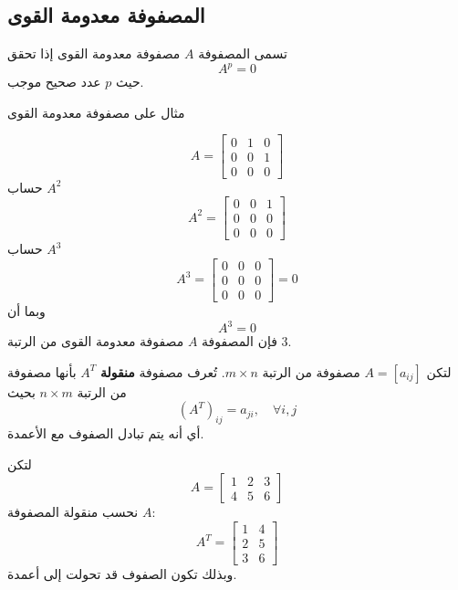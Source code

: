 	\subsection{المصفوفة معدومة القوى}
	تسمى المصفوفة $A$ مصفوفة معدومة القوى إذا تحقق
	\[
	A^p = 0
	\]
	حيث $p$ عدد صحيح موجب.\\
	\begin{example}
		مثال على مصفوفة معدومة القوى
		
		\[
		A=
		\begin{bmatrix}
			0 & 1 & 0\\
			0 & 0 & 1\\
			0 & 0 & 0
		\end{bmatrix}
		\]
		حساب \(A^2\)
		\[
		A^2 =
		\begin{bmatrix}
			0 & 0 & 1\\
			0 & 0 & 0\\
			0 & 0 & 0
		\end{bmatrix}
		\]
		حساب \(A^3\)
		\[
		A^3 =
		\begin{bmatrix}
			0 & 0 & 0\\
			0 & 0 & 0\\
			0 & 0 & 0
		\end{bmatrix}
		= 0
		\]
		وبما أن
		\[
		A^3 = 0
		\]
		فإن المصفوفة \(A\) مصفوفة معدومة القوى من الرتبة \(3\).
	\end{example}
	
	\begin{definition}
		لتكن $A = [a_{ij}]$ مصفوفة من الرتبة $m \times n$.  
		تُعرف مصفوفة \textbf{منقولة} $A^T$ بأنها مصفوفة من الرتبة $n \times m$ بحيث
		\[
		(A^T)_{ij} = a_{ji}, \quad \forall i,j
		\]
		أي أنه يتم تبادل الصفوف مع الأعمدة.
	\end{definition}
	\begin{example}
		
		لتكن
		\[
		A=
		\begin{bmatrix}
			1 & 2 & 3\\
			4 & 5 & 6
		\end{bmatrix}
		\]
		نحسب منقولة المصفوفة \(A\):
		\[
		A^T =
		\begin{bmatrix}
			1 & 4\\
			2 & 5\\
			3 & 6
		\end{bmatrix}
		\]
		وبذلك تكون الصفوف قد تحولت إلى أعمدة.
	\end{example}
	
	
